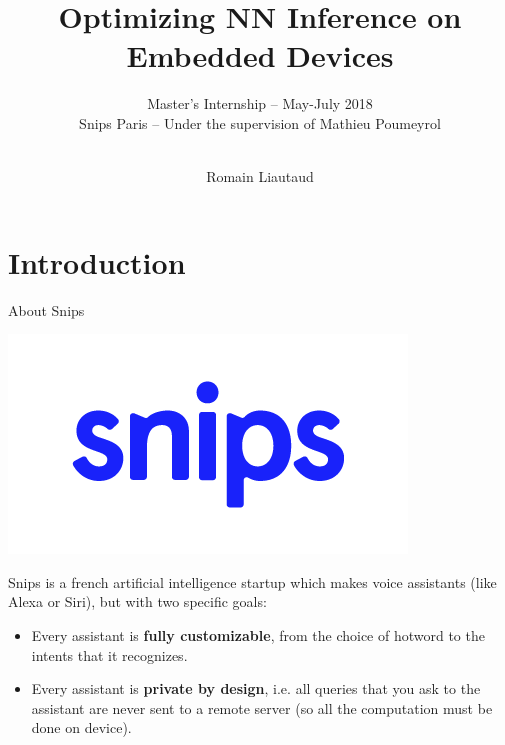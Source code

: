 \documentclass{beamer}
\begin{document}
\title{Optimizing NN Inference on Embedded Devices}
\subtitle{\vspace{0.8em}\small Master's Internship -- May-July 2018\\Snips Paris -- Under the supervision of Mathieu Poumeyrol}
\author{\vspace{0.5em}\\ Romain Liautaud\vspace{-2em}}
\date{}

{
\frame{\titlepage}
}


\section{Introduction}

\begin{frame}{About Snips}
\begin{center}
    \includegraphics[width=.3\textwidth]{snips-logo.png}
\end{center}

Snips is a french artificial intelligence startup which makes voice assistants (like Alexa or Siri), but with two specific goals:
\begin{itemize}
    \item Every assistant is \textbf{fully customizable}, from the choice of hotword to the intents that it recognizes.
    \item Every assistant is \textbf{private by design}, i.e. all queries that you ask to the assistant are never sent to a remote server (so all the computation must be done on device).
\end{itemize}
\vspace{2em}
\end{frame}
\end{document}
